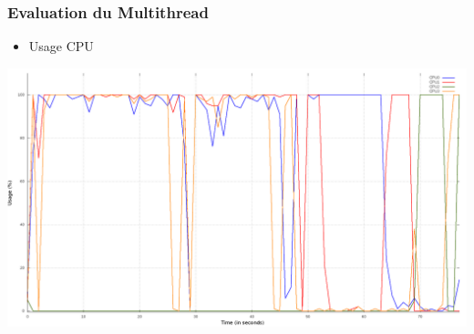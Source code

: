 
\begin{frame}
  \frametitle{Evaluation du Multithread}

  \begin{itemize}
  \item Usage CPU
  \end{itemize}

  \begin{center}
    \includegraphics[scale=0.24]{include/cpu_usage.png}
  \end{center}

\end{frame}

